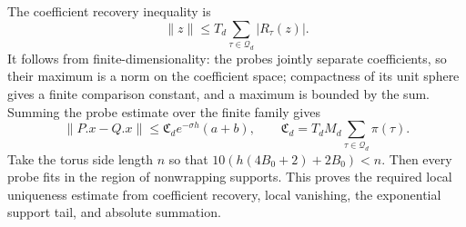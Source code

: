 The coefficient recovery inequality is
\[
 \|z\|\leq T_d\sum_{\tau\in\mathcal Q_d}|R_\tau(z)|.
\]
It follows from finite-dimensionality: the probes jointly separate
coefficients, so their maximum is a norm on the coefficient space; compactness
of its unit sphere gives a finite comparison constant, and a maximum is
bounded by the sum. Summing the probe estimate over the finite family gives
\begin{equation}
 \|P.x-Q.x\|\leq \mathfrak C_d e^{-\sigma h}(a+b),\qquad
 \mathfrak C_d=T_dM_d\sum_{\tau\in\mathcal Q_d}\pi(\tau).
 \label{eq:ex-lattice-local-uniqueness}
\end{equation}
Take the torus side length \(n\) so that
\(10(h(4B_0+2)+2B_0)<n\). Then every probe fits in the region of
nonwrapping supports. This proves the required local uniqueness estimate
from coefficient recovery, local vanishing, the exponential support tail,
and absolute summation.

